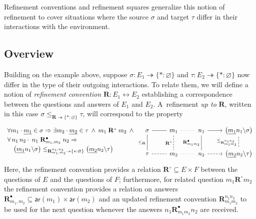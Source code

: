 \documentclass[acmsmall,nonacm]{acmart}
\newcommand{\kw}[1]{\ensuremath{ \mathsf{#1} }}
\begin{document}
Refinement conventions and refinement squares
generalize this notion of refinement
to cover situations where the source $\sigma$ and target $\tau$
differ in their interactions with the environment.


\subsection{Overview} %

Building on the example above, suppose
$\sigma : E_1 \twoheadrightarrow \{* : \varnothing\}$ and
$\tau : E_2 \twoheadrightarrow \{* : \varnothing\}$
now differ in the type of their outgoing interactions.
To relate them,
we will define a notion of \emph{refinement convention}
$\mathbf{R} : E_1 \leftrightarrow E_2$
establishing a correspondence between
the questions and answers of $E_1$ and $E_2$.
A~refinement \emph{up to} $\mathbf{R}$,
written in this case
$\sigma \le_{\mathbf{R} \twoheadrightarrow \{*:\varnothing\}} \tau$,
will correspond to the property
\begin{equation} \label{eqn:simupto}
  \begin{array}{l}
  \forall m_1 \cdot \underline{m_1} \in \sigma \Rightarrow {}
  \exists m_2 \cdot \underline{m_2} \in \tau \:\wedge\:
    m_1 \mathrel{\mathbf{R}^\circ} m_2 \:\wedge\: {}
  \\[0.66ex]
  \forall \, n_1 \, n_2 \cdot \:
    n_1 \mathrel{\mathbf{R}^\bullet_{m_1,m_2}} n_2 \Rightarrow
  \\[0.66ex] \quad
    \bigl(\underline{m_1} n_1 \backslash \sigma \bigr)
    \le_{\mathbf{R}_{m_1,m_2}^{n_1,n_2} \twoheadrightarrow \{*:\varnothing\}}
    \bigl(\underline{m_2} n_2 \backslash \tau \bigr)
  \end{array}
  \hspace{-1ex} %
  \begin{tikzcd}
    \sigma \ar[r,dash] \ar[d, dash, "\le_\mathbf{R}"'] &
    m_1 \ar[r,dotted,dash] \ar[d,dash,dashed,"\mathbf{R}^\circ"'] &
    n_1 \ar[r] \ar[d,dash, "\mathbf{R}^\bullet_{m_1m_2}"'] &
    \bigl(\underline{m_1} n_1 \backslash \sigma \bigr)
    \ar[d, dash, dashed, "\le_{\mathbf{R}_{m_1m_2}^{n_1n_2}}"']
    \\
    \tau \ar[r,dashed,dash] &
    m_2 \ar[r,dotted,dash] &
    n_2 \ar[r,dashed] &
    \bigl(\underline{m_2} n_2 \backslash \tau \bigr)
  \end{tikzcd}
\end{equation}
Here,
the refinement convention provides a relation
$\mathbf{R}^\circ \subseteq E \times F$
between the questions of $E$ and the questions of $F$;
furthermore, for related question $m_1 \mathrel{\mathbf{R}^\circ} m_2$
the refinement convention provides a relation on answers
$\mathbf{R}^\bullet_{m_1,m_2} \subseteq \kw{ar}(m_1) \times \kw{ar}(m_2)$
and an updated refinement convention
$\mathbf{R}_{m_1m_2}^{n_1n_2}$ to be used for the next question
whenever the answers $n_1 \mathrel{\mathbf{R}^\bullet_{m_1m_2}} n_2$
are received.
\end{document}
